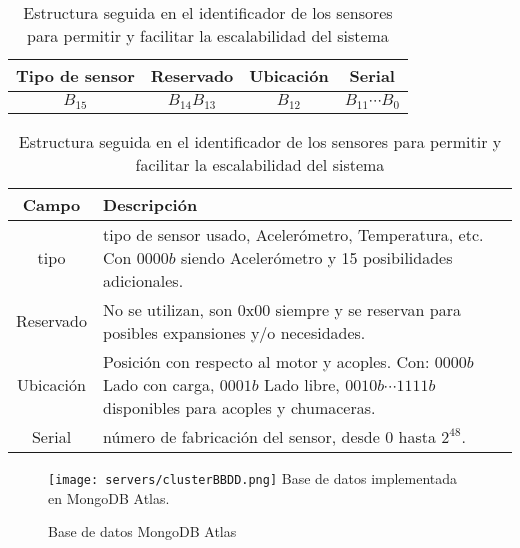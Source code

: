     \begin{table}[ht]
        \begin{center}
        \caption[Estructura IdSensor]{Estructura seguida en el identificador de
        los sensores para permitir y facilitar la escalabilidad del sistema}
        \label{tab:CodIdSensor}

            \vspace{0.3cm}
            \begin{tabular}{|c|c|c|c|}
                \hline
                Tipo de sensor & Reservado& Ubicación   & Serial \\\hline
                $ B_{15} $ & $ B_{14}B_{13} $ &$ B_{12} $  &  $ B_{11}\cdots B_{0} $\\
                \hline
            \end{tabular}

            \vspace{0.3cm}
            \begin{tabular}{|c|p{13cm}|}
                \hline
                Campo       & Descripción
                \\\hline\hline
                tipo        & tipo de sensor usado, Acelerómetro, Temperatura, etc.
                Con $0000b$ siendo Acelerómetro y 15 posibilidades adicionales.
                \\\hline
                Reservado   & No se utilizan, son 0x00 siempre y se reservan para
                posibles expansiones y/o necesidades.
                \\\hline
                Ubicación   & Posición con respecto al motor y acoples. Con:
                $0000b$ Lado con carga, $ 0001b$ Lado libre, $ 0010b\cdots1111b $
                disponibles para acoples y chumaceras.
                \\\hline
                Serial      & número de fabricación del sensor, desde 0 hasta $2^{48}$.
                \\\hline
            \end{tabular}
        \end{center}
    \end{table}

	\begin{figure}[htb]
		\centering
        \caption{Base de datos MongoDB Atlas}
        \texttt{[image: servers/clusterBBDD.png]}
        Base de datos implementada en MongoDB Atlas.    \label{img:clusterBBDD}
	\end{figure}

